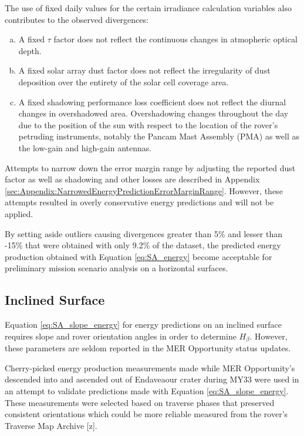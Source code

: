
The use of fixed daily values for the certain irradiance calculation variables also contributes to the observed divergences:
\begin{enumerate}[(a)]
  \item A fixed $\tau$ factor does not reflect the continuous changes in atmopheric optical depth.
  \item A fixed solar array dust factor does not reflect the irregularity of dust deposition over the entirety of the solar cell coverage area.
  \item A fixed shadowing performance loss coefficient does not reflect the diurnal changes in overshadowed area. Overshadowing changes throughout the day due to the position of the sun with respect to the location of the rover's petruding instruments, notably the Pancam Mast Assembly (PMA) as well as the low-gain and high-gain antennas.
\end{enumerate}

Attempts to narrow down the error margin range by adjusting the reported dust factor as well as shadowing and other losses are described in Appendix \ref{sec:Appendix:NarrowedEnergyPredictionErrorMarginRange}. However, these attempts resulted in overly conservative energy predictions and will not be applied.

By setting aside outliers causing divergences greater than 5\% and lesser than -15\% that were obtained with only 9.2\% of the dataset, the predicted energy production obtained with Equation \ref{eq:SA_energy} become acceptable for preliminary mission scenario analysis on a horizontal surfaces.

\clearpage
\subsection{Inclined Surface}
\label{sec:PowerAndEnergyPredictions:Validation:InclinedSurface}

Equation \ref{eq:SA_slope_energy} for energy predictions on an inclined surface requires slope and rover orientation angles in order to determine $H_{\beta}$. However, these parameters are seldom reported in the MER Opportunity status updates.

Cherry-picked energy production measurements made while MER Opportunity's descended into and ascended out of Endaveaour crater during MY33 were used in an attempt to validate predictions made with Equation \ref{eq:SA_slope_energy}. These measurements were selected based on traverse phases that preserved consistent orientations which could be more reliable measured from the rover's Traverse Map Archive [z].

